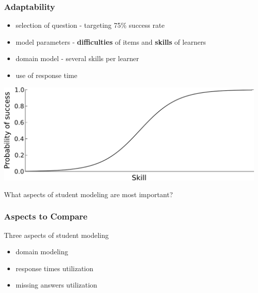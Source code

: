 \documentclass[xcolor=svgnames]{beamer}
\begin{document}
\begin{frame}
    \frametitle{Adaptability}
    \begin{itemize}
        \item selection of question - targeting 75\% success rate
        \item model parameters - \textbf{difficulties} of items and \textbf{skills} of learners
        \item domain model - several skills per learner
        \item use of response time
    \end{itemize}

    \vfill

    \centering
    \includegraphics[width=0.6\linewidth]{figures/logistic}
\end{frame}
\begin{frame}
    \centering

    \huge
    What aspects of student modeling are most important?

\end{frame}
\begin{frame}
    \frametitle{Aspects to Compare}

    Three aspects of student modeling
    \begin{itemize}
        \item domain modeling
        \item response times utilization
        \item missing answers utilization
    \end{itemize}

\end{frame}
\end{document}
